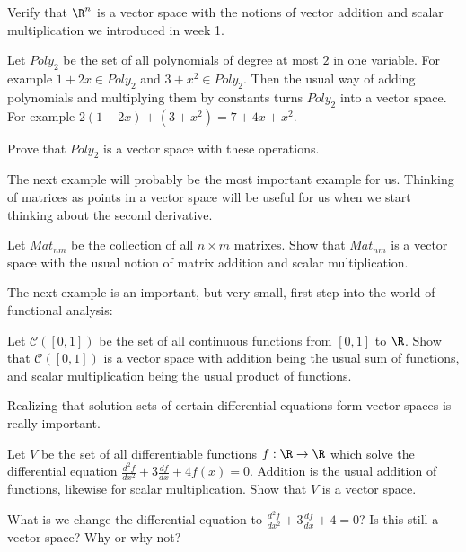 	\begin{question}
		Verify that $\R^n$ is a vector space with the notions of vector addition and scalar multiplication we introduced in week 1.  
	\end{question}

	\begin{question}
		Let $Poly_2$ be the set of all polynomials of degree at most $2$ in one variable.  For example $1+2x \in Poly_2$ and $3+x^2 \in Poly_2$.  Then the usual way of 
		adding polynomials and multiplying them by constants turns $Poly_2$ into a vector space.  For example $2(1+2x)+(3+x^2)  = 7+4x+x^2$.
		
		Prove that $Poly_2$ is a vector space with these operations.
	\end{question}
	
	The next example will probably be the most important example for us.  Thinking of matrices as points in a vector space will be useful for us when we 
	start thinking about the second derivative.
	
	\begin{question}
		Let $Mat_{nm}$ be the collection of all $n \times m$ matrixes.  Show that $Mat_{nm}$ is a vector space with the usual notion of matrix addition and scalar multiplication.
	\end{question}
	
	The next example is an important, but very small, first step into the world of functional analysis:
	
	\begin{question}
		Let $\mathcal{C}([0,1])$ be the set of all continuous functions from $[0,1]$ to $\R$.  Show that $\mathcal{C}([0,1])$ is a vector space with addition 
		being the usual sum of functions, and scalar multiplication being the usual product of functions.
	\end{question}
	
	Realizing that solution sets of certain differential equations form vector spaces is really important.  
	
	\begin{question}
		Let $V$ be the set of all differentiable functions $f: \R \to \R$ which solve the differential equation $\frac{d^2f}{dx^2} + 3\frac{df}{dx} +4f(x) = 0$.
		Addition is the usual addition of functions, likewise for scalar multiplication.  Show that $V$ is a vector space.
		
		What is we change the differential equation to $\frac{d^2f}{dx^2} + 3\frac{df}{dx} +4 = 0$?  Is this still a vector space?  Why or why not?
	\end{question}
	
